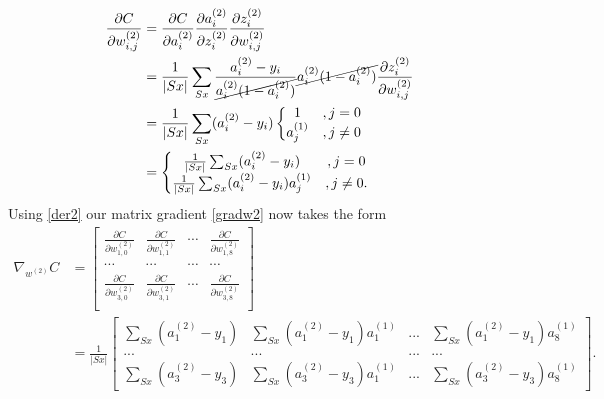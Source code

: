 \documentclass[12pt,titlepage]{article}
\begin{document}
\begin{equation} \label{der2}
\begin{split}
\frac{\partial C}{\partial w_{i,j}^{(2)}}&=\frac{\partial C}{\partial a_{i}^{(2)}}\frac{\partial a_{i}^{(2)}}{\partial z_{i}^{(2)}}\frac{\partial z_{i}^{(2)}}{\partial w_{i,j}^{(2)}}\\
&=\frac{1}{|Sx|}\sum_{Sx}\frac{a_{i}^{(2)}-y_{i}}{\cancel{a_{i}^{(2)}(1-a_{i}^{(2)})}}\cancel{a_{i}^{(2)}(1-a_{i}^{(2)})}\frac{\partial z_{i}^{(2)}}{\partial w_{i,j}^{(2)}}\\
&=\frac{1}{|Sx|}\sum_{Sx}(a_{i}^{(2)}-y_{i})\left\{\begin{matrix} 1&, j=0\\ a_{j}^{(1)}&, j\neq 0 \end{matrix}\right.\\
&=\left\{\begin{matrix} \frac{1}{|Sx|}\sum_{Sx}(a_{i}^{(2)}-y_{i})&, j=0\\ \frac{1}{|Sx|}\sum_{Sx}(a_{i}^{(2)}-y_{i})a_{j}^{(1)}&, j\neq 0. \end{matrix}\right.
\end{split}
\end{equation}
Using \eqref{der2} our matrix gradient \eqref{gradw2} now takes the form
\begin{equation} \label{gradw2f}
\begin{split}
\nabla_{w^{(2)}}C&=\begin{bmatrix}
 \frac{\partial C}{\partial w_{1,0}^{(2)}}& \frac{\partial C}{\partial w_{1,1}^{(2)}} &\cdots &\frac{\partial C}{\partial w_{1,8}^{(2)}}\\ 
 \cdots&\cdots&\cdots&\cdots \\
 \frac{\partial C}{\partial w_{3,0}^{(2)}}& \frac{\partial C}{\partial w_{3,1}^{(2)}} &\cdots &\frac{\partial C}{\partial w_{3,8}^{(2)}}\\ 
\end{bmatrix}\\ 
&=\frac{1}{|Sx|}\begin{bmatrix}
 \sum_{Sx}(a_{1}^{(2)}-y_{1}) &\sum_{Sx}(a_{1}^{(2)}-y_{1})a_{1}^{(1)}  &...  &\sum_{Sx}(a_{1}^{(2)}-y_{1})a_{8}^{(1)} \\ 
 ...&...  &... &... \\ 
 \sum_{Sx}(a_{3}^{(2)}-y_{3}) &\sum_{Sx}(a_{3}^{(2)}-y_{3})a_{1}^{(1)}  &...  &\sum_{Sx}(a_{3}^{(2)}-y_{3})a_{8}^{(1)}
\end{bmatrix}.
\end{split}
\end{equation}
\end{document}
